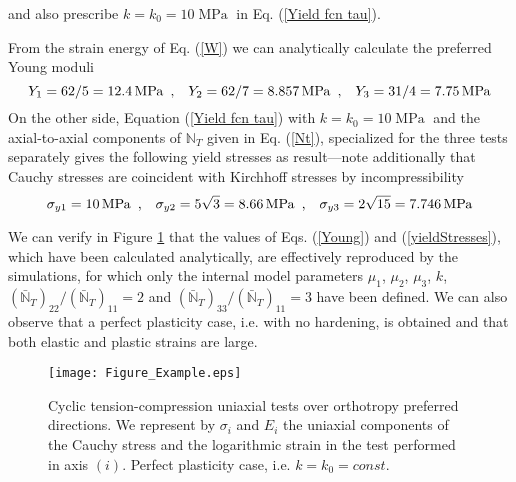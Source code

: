 \documentclass[preprint,review,12pt,sort&compress]{elsarticle}%
\begin{document}
and also prescribe $k=k_{0}=10%
\operatorname{MPa}%
$ in Eq. (\ref{Yield fcn tau}).

From the strain energy of Eq. (\ref{W}) we can analytically calculate the
preferred Young moduli \cite{LatMonCM2015}%
\begin{equation}
Y_{1}=62/5=12.4%
\operatorname{MPa}%
~\text{,\quad}Y_{2}=62/7=8.857%
\operatorname{MPa}%
~\text{,\quad}Y_{3}=31/4=7.75%
\operatorname{MPa}
\label{Young}%
\end{equation}
On the other side, Equation (\ref{Yield fcn tau}) with $k=k_{0}=10%
\operatorname{MPa}%
$ and the axial-to-axial components of $\mathbb{N}_{T}$ given in Eq.
(\ref{Nt}), specialized for the three tests separately gives the following
yield stresses as result---note additionally that Cauchy stresses are
coincident with Kirchhoff stresses by incompressibility%
\begin{equation}
\sigma_{y1}=10%
\operatorname{MPa}%
~\text{,\quad}\sigma_{y2}=5\sqrt{3}=8.66%
\operatorname{MPa}%
~\text{,\quad}\sigma_{y3}=2\sqrt{15}=7.746%
\operatorname{MPa}
\label{yieldStresses}%
\end{equation}


We can verify in Figure \ref{Figure - Figure_Example.eps} that the values of
Eqs. (\ref{Young}) and (\ref{yieldStresses}), which have been calculated
analytically, are effectively reproduced by the simulations, for which only
the internal model parameters $\mu_{1}$, $\mu_{2}$, $\mu_{3}$, $k$,
$(\mathbb{\bar{N}}_{T})_{22}/(\mathbb{\bar{N}}_{T})_{11}=2$ and $(\mathbb{\bar
{N}}_{T})_{33}/(\mathbb{\bar{N}}_{T})_{11}=3$ have been defined. We can also
observe that a perfect plasticity case, i.e. with no hardening, is obtained
and that both elastic and plastic strains are large.

\begin{figure}[h]
\begin{center}
\texttt{[image: Figure\_Example.eps]}
\end{center}
\caption{Cyclic tension-compression uniaxial tests over orthotropy preferred
directions. We represent by $\sigma_{i}$ and $E_{i}$ the uniaxial components
of the Cauchy stress and the logarithmic strain in the test performed in axis
$(i)$. Perfect plasticity case, i.e. $k=k_{0}=const$.}%
\label{Figure - Figure_Example.eps}%
\end{figure}
\end{document}
